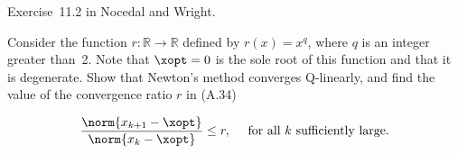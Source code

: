 \begin{problem}\label{prob:01}%
  Exercise~11.2 in Nocedal and Wright.
  
  \noindent
  Consider the function $r:\mathbb{R} \rightarrow \mathbb{R}$ defined by $r(x)=x^{q}$, where $q$ is an integer greater than~2.  Note that ${\xopt = 0}$ is the sole root of this function and that it is degenerate.  Show that Newton's method converges Q-linearly, and find the value of the convergence ratio $r$ in (A.34)
  
  \[\frac{\norm{x_{k+1}-\xopt}}{\norm{x_k-\xopt}} \le r,~~~~\text{for all $k$ sufficiently large}  \text{.}\]
\end{problem}

